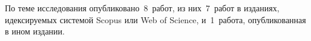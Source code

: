 {\begin{refsection}
        По теме исследования опубликовано~8~работ, из них~7~работ в изданиях, идексируемых системой Scopus или Web of Science, и~1~работа, опубликованная в ином издании.
        
    \end{refsection}%
    \begin{refsection}
    \end{refsection}%
}


